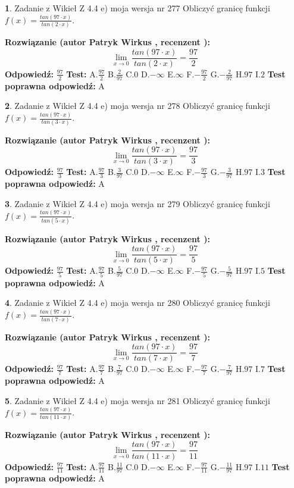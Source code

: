 \documentclass[12pt, a4paper]{article}
\theoremstyle{definition} %
\newtheorem{zad}{}
\newcommand{\zadStart}[1]{\begin{zad}#1\newline}
\newcommand{\zadStop}{\end{zad}}
\newcommand{\rozwStart}[2]{\noindent \textbf{Rozwiązanie (autor #1 , recenzent #2): }\newline}
\newcommand{\rozwStop}{\newline}
\newcommand{\odpStart}{\noindent \textbf{Odpowiedź:}\newline}
\newcommand{\odpStop}{\newline}
\newcommand{\testStart}{\noindent \textbf{Test:}\newline}
\newcommand{\testStop}{\newline}
\newcommand{\kluczStart}{\noindent \textbf{Test poprawna odpowiedź:}\newline}
\newcommand{\kluczStop}{\newline}
\begin{document}
\zadStart{Zadanie z Wikieł Z 4.4 e) moja wersja nr 277}
Obliczyć granicę funkcji $f(x)=\frac{tan(97\cdot x)}{tan(2\cdot x)}$.
\zadStop
\rozwStart{Patryk Wirkus}{}
$$\lim\limits_{x\to 0}\frac{tan(97\cdot x)}{tan(2\cdot x)}=
\frac{97}{2}$$
\rozwStop
\odpStart
$\frac{97}{2}$
\odpStop
\testStart
A.$\frac{97}{2}$
B.$\frac{2}{97}$
C.$0$
D.$-\infty$
E.$\infty$
F.$-\frac{97}{2}$
G.$-\frac{2}{97}$
H.$97$
I.$2$
\testStop
\kluczStart
A
\kluczStop



\zadStart{Zadanie z Wikieł Z 4.4 e) moja wersja nr 278}
Obliczyć granicę funkcji $f(x)=\frac{tan(97\cdot x)}{tan(3\cdot x)}$.
\zadStop
\rozwStart{Patryk Wirkus}{}
$$\lim\limits_{x\to 0}\frac{tan(97\cdot x)}{tan(3\cdot x)}=
\frac{97}{3}$$
\rozwStop
\odpStart
$\frac{97}{3}$
\odpStop
\testStart
A.$\frac{97}{3}$
B.$\frac{3}{97}$
C.$0$
D.$-\infty$
E.$\infty$
F.$-\frac{97}{3}$
G.$-\frac{3}{97}$
H.$97$
I.$3$
\testStop
\kluczStart
A
\kluczStop



\zadStart{Zadanie z Wikieł Z 4.4 e) moja wersja nr 279}
Obliczyć granicę funkcji $f(x)=\frac{tan(97\cdot x)}{tan(5\cdot x)}$.
\zadStop
\rozwStart{Patryk Wirkus}{}
$$\lim\limits_{x\to 0}\frac{tan(97\cdot x)}{tan(5\cdot x)}=
\frac{97}{5}$$
\rozwStop
\odpStart
$\frac{97}{5}$
\odpStop
\testStart
A.$\frac{97}{5}$
B.$\frac{5}{97}$
C.$0$
D.$-\infty$
E.$\infty$
F.$-\frac{97}{5}$
G.$-\frac{5}{97}$
H.$97$
I.$5$
\testStop
\kluczStart
A
\kluczStop



\zadStart{Zadanie z Wikieł Z 4.4 e) moja wersja nr 280}
Obliczyć granicę funkcji $f(x)=\frac{tan(97\cdot x)}{tan(7\cdot x)}$.
\zadStop
\rozwStart{Patryk Wirkus}{}
$$\lim\limits_{x\to 0}\frac{tan(97\cdot x)}{tan(7\cdot x)}=
\frac{97}{7}$$
\rozwStop
\odpStart
$\frac{97}{7}$
\odpStop
\testStart
A.$\frac{97}{7}$
B.$\frac{7}{97}$
C.$0$
D.$-\infty$
E.$\infty$
F.$-\frac{97}{7}$
G.$-\frac{7}{97}$
H.$97$
I.$7$
\testStop
\kluczStart
A
\kluczStop



\zadStart{Zadanie z Wikieł Z 4.4 e) moja wersja nr 281}
Obliczyć granicę funkcji $f(x)=\frac{tan(97\cdot x)}{tan(11\cdot x)}$.
\zadStop
\rozwStart{Patryk Wirkus}{}
$$\lim\limits_{x\to 0}\frac{tan(97\cdot x)}{tan(11\cdot x)}=
\frac{97}{11}$$
\rozwStop
\odpStart
$\frac{97}{11}$
\odpStop
\testStart
A.$\frac{97}{11}$
B.$\frac{11}{97}$
C.$0$
D.$-\infty$
E.$\infty$
F.$-\frac{97}{11}$
G.$-\frac{11}{97}$
H.$97$
I.$11$
\testStop
\kluczStart
A
\kluczStop
\end{document}
